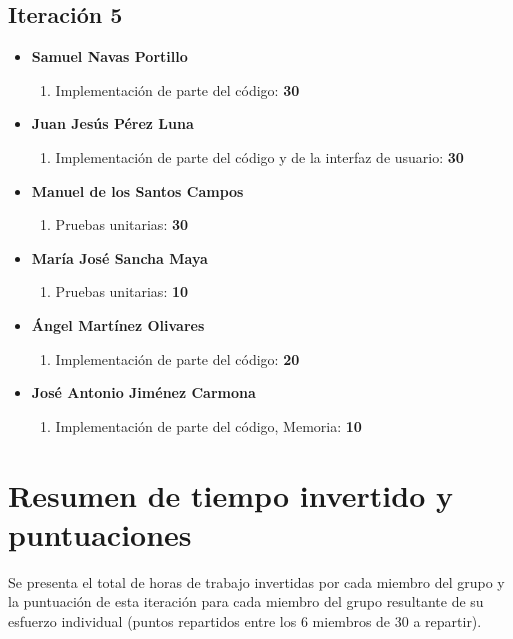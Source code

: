\documentclass[11 pt]{book}
\begin{document}
		\subsection*{Iteración 5}
		    \begin{itemize}
			    \item \textbf {Samuel Navas Portillo}
				    \begin{enumerate}
					    \item Implementación de parte del código: \textbf{30}
				    \end{enumerate}
			    \item \textbf {Juan Jesús Pérez Luna}
				    \begin{enumerate}
					    \item Implementación de parte del código y de la interfaz de usuario: \textbf{30}
				    \end{enumerate}
			    \item \textbf {Manuel de los Santos Campos}
				    \begin{enumerate}
					    \item Pruebas unitarias: \textbf{30}
				    \end{enumerate}
			    \item \textbf {María José Sancha Maya}
				    \begin{enumerate}
					    \item Pruebas unitarias: \textbf{10}
				    \end{enumerate}
			    \item \textbf {Ángel Martínez Olivares}
				    \begin{enumerate}
					    \item Implementación de parte del código: \textbf{20}
				    \end{enumerate}
			    \item \textbf {José Antonio Jiménez Carmona}
				    \begin{enumerate}
					    \item Implementación de parte del código, Memoria: \textbf{10}
				    \end{enumerate}
		    \end{itemize}
		    
	\section{Resumen de tiempo invertido y puntuaciones}
		Se presenta el total de horas de trabajo invertidas por cada miembro del grupo y la puntuación de esta iteración para cada miembro del grupo resultante de su esfuerzo individual (puntos repartidos entre los 6 miembros de 30 a repartir).\\
			
\end{document}

